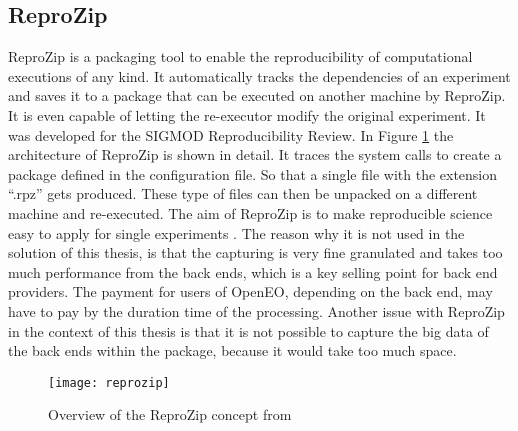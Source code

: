 \documentclass[draft,final]{vutinfth} %
\begin{document}
\subsection{ReproZip}\label{ReproZip}
ReproZip is a packaging tool to enable the reproducibility of computational executions of any kind. It automatically tracks the dependencies of an experiment and saves it to a package that can be executed on another machine by ReproZip. It is even capable of letting the re-executor modify the original experiment. It was developed for the SIGMOD Reproducibility Review. In Figure \ref{fig:reprozip} the architecture of ReproZip is shown in detail. It traces the system calls to create a package defined in the configuration file. So that a single file with the extension “.rpz” gets produced. These type of files can then be unpacked on a different machine and re-executed. The aim of ReproZip is to make reproducible science easy to apply for single experiments \cite{29c5846926a4497d95f276604cb0368c}. The reason why it is not used in the solution of this thesis, is that the capturing is very fine granulated and takes too much performance from the back ends, which is a key selling point for back end providers. The payment for users of OpenEO, depending on the back end, may have to pay by the duration time of the processing. Another issue with ReproZip in the context of this thesis is that it is not possible to capture the big data of the back ends within the package, because it would take too much space.  

\begin{figure}[h]
	\centering
	\texttt{[image: reprozip]}
	\caption{Overview of the ReproZip concept from \cite{29c5846926a4497d95f276604cb0368c} }
	\label{fig:reprozip} %
\end{figure}
\end{document}
